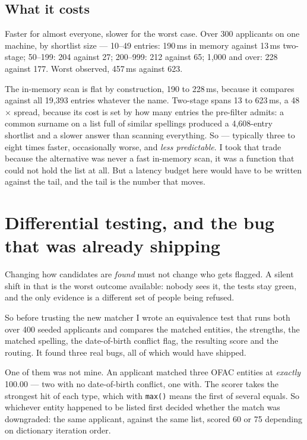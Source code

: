 \documentclass[11pt,a4paper]{article}
\begin{document}
\subsection{What it costs}

Faster for almost everyone, slower for the worst case. Over 300 applicants on
one machine, by shortlist size --- 10--49 entries: 190\,ms in memory against
13\,ms two-stage; 50--199: 204 against 27; 200--999: 212 against 65; 1{,}000 and
over: 228 against 177. Worst observed, 457\,ms against 623.

The in-memory scan is flat by construction, 190 to 228\,ms, because it compares
against all 19{,}393 entries whatever the name. Two-stage spans 13 to 623\,ms, a
48$\times$ spread, because its cost is set by how many entries the pre-filter
admits: a common surname on a list full of similar spellings produced a
4{,}608-entry shortlist and a slower answer than scanning everything. So ---
typically three to eight times faster, occasionally worse, and \emph{less
predictable}. I took that trade because the alternative was never a fast
in-memory scan, it was a function that could not hold the list at all. But a
latency budget here would have to be written against the tail, and the tail is
the number that moves.

\section{Differential testing, and the bug that was already shipping}

Changing how candidates are \emph{found} must not change who gets flagged. A
silent shift in that is the worst outcome available: nobody sees it, the tests
stay green, and the only evidence is a different set of people being refused.

So before trusting the new matcher I wrote an equivalence test that runs both
over 400 seeded applicants and compares the matched entities, the strengths, the
matched spelling, the date-of-birth conflict flag, the resulting score and the
routing. It found three real bugs, all of which would have shipped.

One of them was not mine. An applicant matched three OFAC entities at
\emph{exactly} 100.00 --- two with no date-of-birth conflict, one with. The
scorer takes the strongest hit of each type, which with \texttt{max()} means the
first of several equals. So whichever entity happened to be listed first decided
whether the match was downgraded: the same applicant, against the same list,
scored 60 or 75 depending on dictionary iteration order.
\end{document}
